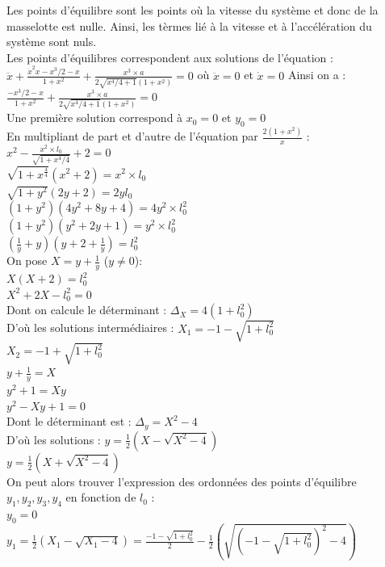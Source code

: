 \documentclass[10pt,a4paper]{article}
\begin{document}
Les points d'équilibre sont les points où la vitesse du système et donc de la masselotte est nulle. Ainsi, les tèrmes lié à la vitesse et à l'accélération du système sont nuls.\\
Les points d'équilibres correspondent aux solutions de l'équation :\\
$ \ddot{x}+\frac{\dot{x}^2x-x^3/2-x}{1+x^2}+\frac{x^3\times a}{2\sqrt{x^4/4+1}(1+x^2)}=0 $
où 
$\ddot{x}=0$ et $\dot{x}=0$
Ainsi on a :\\
$\frac{-x^3/2-x}{1+x^2} + \frac{x^3\times a}{2\sqrt{x^4/4+1}(1+x^2)}=0$ \\
Une première solution correspond à $x_0=0$ et $y_0=0$ \\
En multipliant de part et d'autre de l'équation par $\frac{2(1+x^2)}{x}$ :\\
$x^2-\frac{x^2\times l_0}{\sqrt{1+x^4/4}}+2=0$\\
$\sqrt{1+x^\frac{4}{4}}(x^2+2)=x^2\times l_0$\\
$\sqrt{1+y^2}(2y+2)=2yl_0$\\
$(1+y^2)(4y^2+8y+4)=4y^2\times l_0^2$\\
$(1+y^2)(y^2+2y+1)=y^2\times l_0^2$\\
$(\frac{1}{y}+y)(y+2+\frac{1}{y})=l_0^2$\\
On pose $X=y+\frac{1}{y}$ ($y\neq 0$):\\
$X(X+2)=l_0^2$\\
$X^2+2X-l_0^2=0$\\
Dont on calcule le déterminant :
$\Delta_X=4(1+l_0^2)$\\
D'où les solutions intermédiaires :
$X_1=-1-\sqrt{1+l_0^2}$\\
$X_2=-1+\sqrt{1+l_0^2}$\\
$y+\frac{1}{y}=X$\\
$y^2+1=Xy$\\
$y^2-Xy+1=0$\\
Dont le déterminant est :
$\Delta_y=X^2-4$\\
D'où les solutions :
$y=\frac{1}{2}(X-\sqrt{X^2-4})$\\
$y=\frac{1}{2}(X+\sqrt{X^2-4})$\\
On peut alors trouver l'expression des ordonnées des points d'équilibre $y_1,y_2,y_3,y_4$ en fonction de $l_0$ :\\
$y_0=0$\\
$y_1=\frac{1}{2}(X_1-\sqrt{X_1-4})=\frac{-1-\sqrt{1+l_0^2}}{2}-\frac{1}{2}(\sqrt{(-1-\sqrt{1+l_0^2})^2-4})$\\
\end{document}
